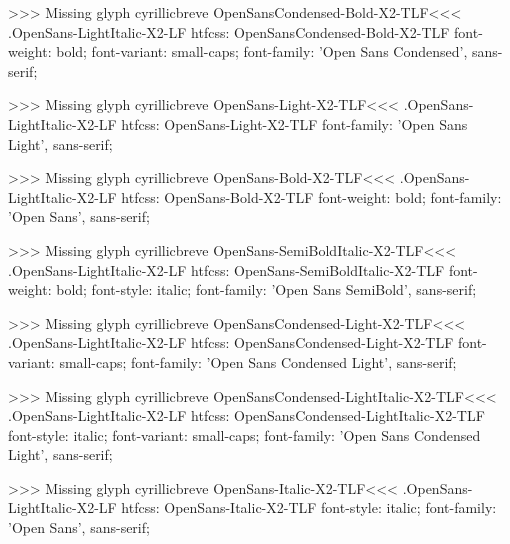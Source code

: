 >>>
Missing glyph	cyrillicbreve
\<OpenSansCondensed-Bold-X2-TLF\><<<
.OpenSans-LightItalic-X2-LF
htfcss:  OpenSansCondensed-Bold-X2-TLF  font-weight: bold; font-variant: small-caps; font-family: 'Open Sans Condensed', sans-serif;

>>>
Missing glyph	cyrillicbreve
\<OpenSans-Light-X2-TLF\><<<
.OpenSans-LightItalic-X2-LF
htfcss:  OpenSans-Light-X2-TLF  font-family: 'Open Sans Light', sans-serif;

>>>
Missing glyph	cyrillicbreve
\<OpenSans-Bold-X2-TLF\><<<
.OpenSans-LightItalic-X2-LF
htfcss:  OpenSans-Bold-X2-TLF  font-weight: bold; font-family: 'Open Sans', sans-serif;

>>>
Missing glyph	cyrillicbreve
\<OpenSans-SemiBoldItalic-X2-TLF\><<<
.OpenSans-LightItalic-X2-LF
htfcss:  OpenSans-SemiBoldItalic-X2-TLF  font-weight: bold; font-style: italic; font-family: 'Open Sans SemiBold', sans-serif;

>>>
Missing glyph	cyrillicbreve
\<OpenSansCondensed-Light-X2-TLF\><<<
.OpenSans-LightItalic-X2-LF
htfcss:  OpenSansCondensed-Light-X2-TLF  font-variant: small-caps; font-family: 'Open Sans Condensed Light', sans-serif;

>>>
Missing glyph	cyrillicbreve
\<OpenSansCondensed-LightItalic-X2-TLF\><<<
.OpenSans-LightItalic-X2-LF
htfcss:  OpenSansCondensed-LightItalic-X2-TLF  font-style: italic; font-variant: small-caps; font-family: 'Open Sans Condensed Light', sans-serif;

>>>
Missing glyph	cyrillicbreve
\<OpenSans-Italic-X2-TLF\><<<
.OpenSans-LightItalic-X2-LF
htfcss:  OpenSans-Italic-X2-TLF  font-style: italic; font-family: 'Open Sans', sans-serif;

